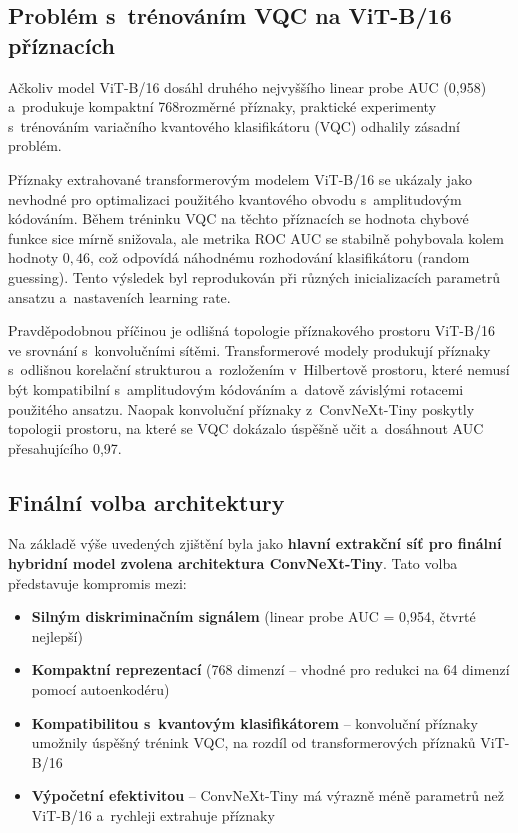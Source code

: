 \documentclass[12pt, a4paper]{report}
\begin{document}
\subsection{Problém s~trénováním VQC na ViT-B/16 příznacích} \label{subsec:vit_vqc_failure}

Ačkoliv model ViT-B/16 dosáhl druhého nejvyššího linear probe AUC (0,958) a~produkuje kompaktní 768rozměrné příznaky, praktické experimenty s~trénováním variačního kvantového klasifikátoru (VQC) odhalily zásadní problém.

Příznaky extrahované transformerovým modelem ViT-B/16 se ukázaly jako nevhodné pro optimalizaci použitého kvantového obvodu s~amplitudovým kódováním. Během tréninku VQC na těchto příznacích se hodnota chybové funkce sice mírně snižovala, ale metrika ROC AUC se stabilně pohybovala kolem hodnoty $0{,}46$, což odpovídá náhodnému rozhodování klasifikátoru (random guessing). Tento výsledek byl reprodukován při různých inicializacích parametrů ansatzu a~nastaveních learning rate.

Pravděpodobnou příčinou je odlišná topologie příznakového prostoru ViT-B/16 ve srovnání s~konvolučními sítěmi. Transformerové modely produkují příznaky s~odlišnou korelační strukturou a~rozložením v~Hilbertově prostoru, které nemusí být kompatibilní s~amplitudovým kódováním a~datově závislými rotacemi použitého ansatzu. Naopak konvoluční příznaky z~ConvNeXt-Tiny poskytly topologii prostoru, na které se VQC dokázalo úspěšně učit a~dosáhnout AUC přesahujícího 0,97.

\subsection{Finální volba architektury}

Na základě výše uvedených zjištění byla jako \textbf{hlavní extrakční síť pro finální hybridní model zvolena architektura ConvNeXt-Tiny}. Tato volba představuje kompromis mezi:

\begin{itemize}
    \item \textbf{Silným diskriminačním signálem} (linear probe AUC = 0,954, čtvrté nejlepší)
    \item \textbf{Kompaktní reprezentací} (768 dimenzí -- vhodné pro redukci na 64 dimenzí pomocí autoenkodéru)
    \item \textbf{Kompatibilitou s~kvantovým klasifikátorem} -- konvoluční příznaky umožnily úspěšný trénink VQC, na rozdíl od transformerových příznaků ViT-B/16
    \item \textbf{Výpočetní efektivitou} -- ConvNeXt-Tiny má výrazně méně parametrů než ViT-B/16 a~rychleji extrahuje příznaky
\end{itemize}
\end{document}

